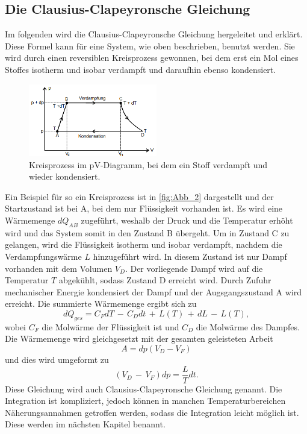 \subsection{Die Clausius-Clapeyronsche Gleichung} %
\label{sub:CC-Gl}
Im folgenden wird die Clausius-Clapeyronsche Gleichung hergeleitet und erklärt. 
Diese Formel kann für eine System, wie oben beschrieben, benutzt werden.
Sie wird durch einen reversiblen Kreisprozess gewonnen, bei dem erst ein Mol eines Stoffes isotherm und isobar verdampft und daraufhin ebenso kondensiert.
\begin{figure}[H]
    \centering
    \includegraphics[width=0.5\textwidth]{build/Abb_2.PNG}
    \caption {Kreisprozess im pV-Diagramm, bei dem ein Stoff verdampft und wieder kondensiert.\cite{v203}}
    \label{fig:Abb_2}
\end{figure}
Ein Beispiel für so ein Kreisprozess ist in \autoref{fig:Abb_2} dargestellt und der Startzustand ist bei A, bei dem nur Flüssigkeit vorhanden ist.
Es wird eine Wärmemenge $dQ_{AB}$ zugeführt, weshalb der Druck und die Temperatur erhöht wird und das System somit in den Zustand B übergeht.
Um in Zustand C zu gelangen, wird die Flüssigkeit isotherm und isobar verdampft, nachdem die Verdampfungswärme $L$ hinzugeführt wird.
In diesem Zustand ist nur Dampf vorhanden mit dem Volumen $V_D$.
Der vorliegende Dampf wird auf die Temperatur $T$ abgekühlt, sodass Zustand D erreicht wird.
Durch Zufuhr mechanischer Energie kondensiert der Dampf und der Augsgangszustand A wird erreicht.
Die summierte Wärmemenge ergibt sich zu
\begin{equation}
    dQ_{ges} = C_F dT \,-\, C_D dt \,+\, L(T) \,+\, dL \,-\, L(T),
    \label{eqn:Wärmemenge}
\end{equation}
wobei $C_F$ die Molwärme der Flüssigkeit ist und $C_D$ die Molwärme des Dampfes.
Die Wärmemenge wird gleichgesetzt mit der gesamten geleisteten Arbeit
\begin{equation}
    A = dp(V_D-V_F)
    \label{eqn:Arbeit}
\end{equation}
und dies wird umgeformt zu
\begin{equation}
    (V_D\,-\,V_F)dp = \frac{L}{T}dt .
    \label{eqn:CC-Gl}
\end{equation}
Diese Gleichung wird auch Clausius-Clapeyronsche Gleichung genannt. 
Die Integration ist kompliziert, jedoch können in manchen Temperaturbereichen Näherungsannahmen getroffen werden, sodass die Integration leicht möglich ist.
Diese werden im nächsten Kapitel benannt.

